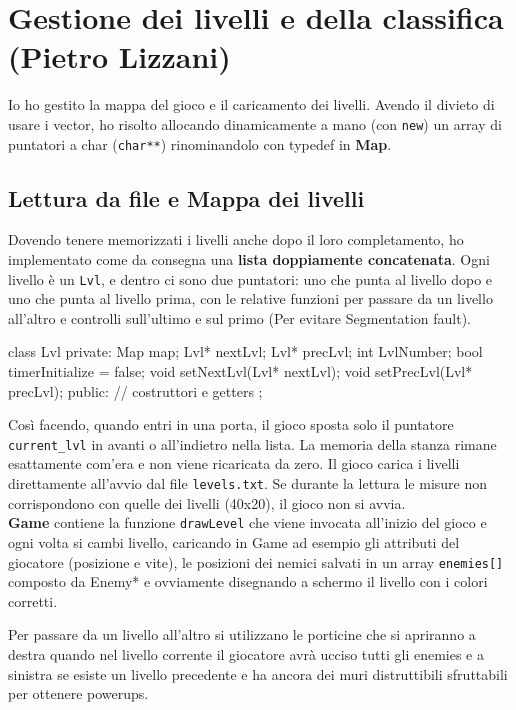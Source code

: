\documentclass[11pt,a4paper]{article}
\begin{document}
\newpage
\section{Gestione dei livelli e della classifica (Pietro Lizzani)}
Io ho gestito la mappa del gioco e il caricamento dei livelli. Avendo il divieto di usare i vector, ho risolto allocando dinamicamente a mano (con \texttt{new}) un array di puntatori a char (\texttt{char**}) rinominandolo con typedef in \textbf{Map}.

\subsection{Lettura da file e Mappa dei livelli}
Dovendo tenere memorizzati i livelli anche dopo il loro completamento, ho implementato come da consegna una \textbf{lista doppiamente concatenata}.
Ogni livello \`e un \texttt{Lvl}, e dentro ci sono due puntatori: uno che punta al livello dopo e uno che punta al livello prima, con le relative funzioni per passare da un livello all'altro e controlli sull'ultimo e sul primo (Per evitare Segmentation fault).

\begin{codesnap}
class Lvl{
  private:
    Map map;
    Lvl* nextLvl;
    Lvl* precLvl;
    int LvlNumber;
    bool timerInitialize = false; 
    void setNextLvl(Lvl* nextLvl);
    void setPrecLvl(Lvl* precLvl);
  public:
    // costruttori e getters
};
\end{codesnap}

Cos\`i facendo, quando entri in una porta, il gioco sposta solo il puntatore \texttt{current\_lvl} in avanti o all'indietro nella lista. La memoria della stanza rimane esattamente com'era e non viene ricaricata da zero. Il gioco carica i livelli direttamente all'avvio dal file \texttt{levels.txt}. Se durante la lettura le misure non corrispondono con quelle dei livelli (40x20), il gioco non si avvia.\\[0.2cm]


\textbf{Game} contiene la funzione \texttt{drawLevel} che viene invocata all'inizio del gioco e ogni volta si cambi livello, caricando in Game ad esempio gli attributi del giocatore (posizione e vite), le posizioni dei nemici salvati in un array \texttt{enemies[]} composto da Enemy* e ovviamente disegnando a schermo il livello con i colori corretti.

Per passare da un livello all'altro si utilizzano le porticine che si apriranno a destra quando nel livello corrente il giocatore avrà ucciso tutti gli enemies e a sinistra se esiste un livello precedente e ha ancora dei muri distruttibili sfruttabili per ottenere powerups.
\end{document}
